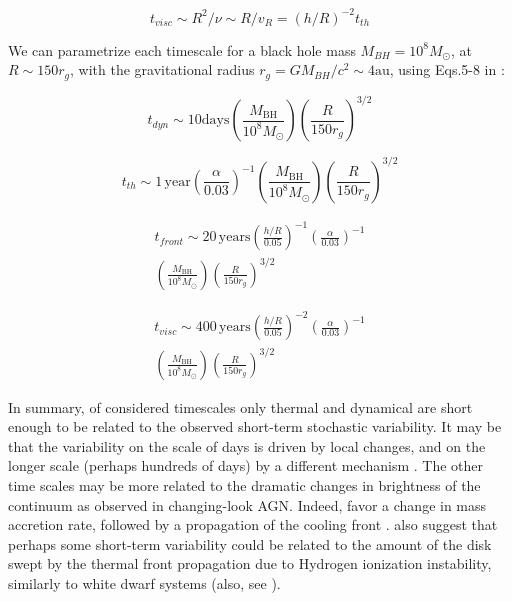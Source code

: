 \documentclass[twocolumn]{aastex62}
\begin{document}
\begin{equation}
t_{visc} {\sim} R^{2} / \nu {\sim}  R / v_{R} = (h/R)^{-2} t_{th}
\end{equation}

 We can parametrize each timescale for a black hole mass $M_{BH} = 10^{8} M_{\odot}$, at $R {\sim} 150 r_{g}$, with the gravitational radius $r_{g} = GM_{BH} / c^{2} {\sim} 4 \mathrm{au}$, using Eqs.5-8 in \cite{stern2018} : 


 \begin{equation}
 t_{dyn} {\sim} 10  \mathrm{days} \left(\frac{M_{\mathrm{BH}}}{10^{8} M_{\odot}} \right) 
 \left( \frac{R}{150 r_{g}}\right) ^{3/2} 
 \end{equation}

 \begin{equation}
 t_{th}   {\sim} 1 \,\mathrm{year} \left( \frac{\alpha}{0.03}\right)^{-1}  
 \left( \frac{M_{\mathrm{BH}}}{10^{8} M_{\odot}}\right) \left( \frac{R}{150 r_{g}}\right)^{3/2} 
 \end{equation}

  \begin{eqnarray}
  t_{front} {\sim} 20 \,\mathrm{years} \left( \frac{h/R}{0.05}\right)^{-1}   \left( \frac{\alpha}{0.03}\right)^{-1}  \nonumber  \\ 
  \left( \frac{M_{\mathrm{BH}}}{10^{8} M_{\odot}}\right)     \left( \frac{R}{150 r_{g}}\right) ^{3/2} 
 \end{eqnarray}

  \begin{eqnarray}
  t_{visc}  {\sim} 400 \, \mathrm{years} \left( \frac{h/R}{0.05}\right)^{-2}   \left( \frac{\alpha}{0.03}\right)^{-1} \nonumber  \\  
  \left(\frac{M_{\mathrm{BH}}}{10^{8} M_{\odot}} \right)     \left( \frac{R}{150 r_{g}}\right) ^{3/2}  
 \end{eqnarray}


In summary,  of  considered timescales only thermal and dynamical are short enough to be related to  the observed short-term stochastic variability. It may be that the variability on the scale of days is driven by local changes, and on the longer scale (perhaps hundreds of days) by a different mechanism \citep{kokubo2015}. The other time scales may be more related to the dramatic changes in brightness of the continuum as observed in changing-look AGN. Indeed, \citet{noda2018} favor a change in mass accretion rate, followed by a propagation of the cooling front \citep{lawrence2018, simm2016}. \citet{noda2018} also suggest that perhaps some short-term variability could be related to the amount of the disk swept by the thermal front propagation due to Hydrogen ionization instability, similarly to white dwarf systems (also, see \citealt{ruan2019, ross2018, sniegowska2019}). 
\end{document}
